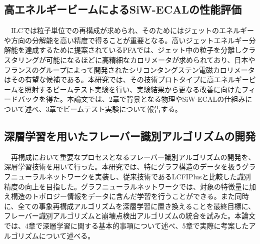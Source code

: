 \subsection{高エネルギービームによるSiW-ECALの性能評価}
　ILCでは粒子単位での再構成が求められ、そのためにはジェットのエネルギーや方向の分解能を高い精度で得ることが重要となる。高いジェットエネルギー分解能を達成するために提案されているPFAでは、ジェット中の粒子を分離しクラスタリングが可能になるほどに高精細なカロリメータが求められており、日本やフランスのグループによって開発されたシリコンタングステン電磁カロリメータはその有望な候補である。本研究では、その技術プロトタイプに高エネルギービームを照射するビームテスト実験を行い、実験結果から更なる改善に向けたフィードバックを得た。本論文では、2章で背景となる物理やSiW-ECALの仕組みについて述べ、3章でビームテスト実験について報告する。\\
\subsection{深層学習を用いたフレーバー識別アルゴリズムの開発}
　再構成において重要なプロセスとなるフレーバー識別アルゴリズムの開発を、深層学習技術を用いて行った。本研究では、特にグラフ構造のデータを扱うグラフニューラルネットワークを実装し、従来技術であるLCFIPlusと比較した識別精度の向上を目指した。グラフニューラルネットワークでは、対象の特徴量に加え構造のトポロジー情報をデータに含んだ学習を行うことができる。また同時に、全ての事象再構成アルゴリズムを深層学習に置き換えることを最終目標に、フレーバー識別アルゴリズムと崩壊点検出アルゴリズムの統合を試みた。本論文では、4章で深層学習に関する基本的事項について述べ、5章で実際に考案したアルゴリズムについて述べる。